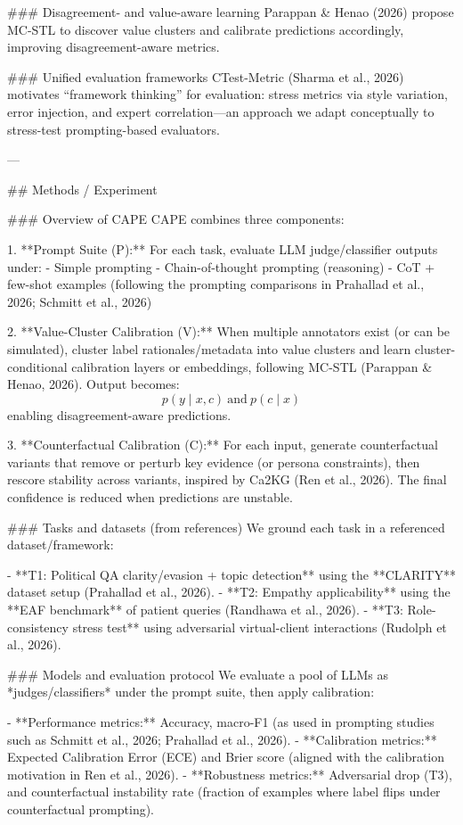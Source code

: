 ### Disagreement- and value-aware learning  
Parappan & Henao (2026) propose MC-STL to discover value clusters and calibrate predictions accordingly, improving disagreement-aware metrics.

### Unified evaluation frameworks  
CTest-Metric (Sharma et al., 2026) motivates “framework thinking” for evaluation: stress metrics via style variation, error injection, and expert correlation—an approach we adapt conceptually to stress-test prompting-based evaluators.

---

## Methods / Experiment  

### Overview of CAPE  
CAPE combines three components:

1. **Prompt Suite (P):** For each task, evaluate LLM judge/classifier outputs under:
   - Simple prompting  
   - Chain-of-thought prompting (reasoning)  
   - CoT + few-shot examples  
   (following the prompting comparisons in Prahallad et al., 2026; Schmitt et al., 2026)

2. **Value-Cluster Calibration (V):** When multiple annotators exist (or can be simulated), cluster label rationales/metadata into value clusters and learn cluster-conditional calibration layers or embeddings, following MC-STL (Parappan & Henao, 2026). Output becomes:  
   \[
   p(y \mid x, c)\ \text{and}\ p(c \mid x)
   \]
   enabling disagreement-aware predictions.

3. **Counterfactual Calibration (C):** For each input, generate counterfactual variants that remove or perturb key evidence (or persona constraints), then rescore stability across variants, inspired by Ca2KG (Ren et al., 2026). The final confidence is reduced when predictions are unstable.

### Tasks and datasets (from references)  
We ground each task in a referenced dataset/framework:

- **T1: Political QA clarity/evasion + topic detection** using the **CLARITY** dataset setup (Prahallad et al., 2026).  
- **T2: Empathy applicability** using the **EAF benchmark** of patient queries (Randhawa et al., 2026).  
- **T3: Role-consistency stress test** using adversarial virtual-client interactions (Rudolph et al., 2026).  

### Models and evaluation protocol  
We evaluate a pool of LLMs as *judges/classifiers* under the prompt suite, then apply calibration:

- **Performance metrics:** Accuracy, macro-F1 (as used in prompting studies such as Schmitt et al., 2026; Prahallad et al., 2026).  
- **Calibration metrics:** Expected Calibration Error (ECE) and Brier score (aligned with the calibration motivation in Ren et al., 2026).  
- **Robustness metrics:** Adversarial drop (T3), and counterfactual instability rate (fraction of examples where label flips under counterfactual prompting).

